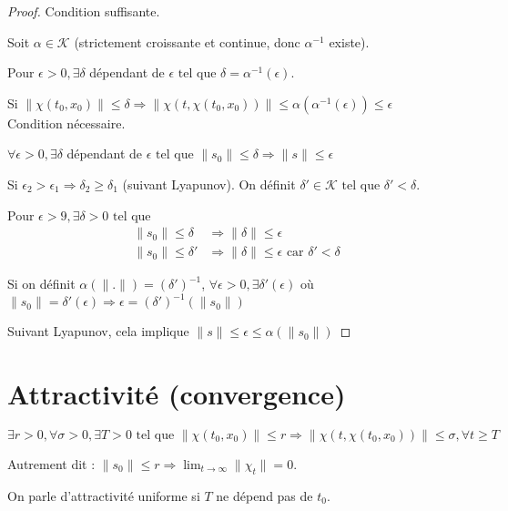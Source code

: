 \documentclass[main.tex]{subfiles} \newcommand{\D}{\mathcal{D}}
\newcommand{\Kc}{\mathcal{K}} \newcommand{\Lc}{\mathcal{L}}
\begin{document}
\begin{proof} Condition suffisante.

  Soit $\alpha \in \Kc$ (strictement croissante et continue, donc $\alpha^{-1}$
	existe).

  Pour $\epsilon >0, \exists \delta$ dépendant de $\epsilon \text{ tel que }
	\delta = \alpha^{-1}(\epsilon)$.

  Si $\|\chi(t_0,x_0)\| \leq \delta \Rightarrow \|\chi(t,\chi(t_0,x_0))\| \leq
	\alpha(\alpha^{-1}(\epsilon)) \leq \epsilon$\\

  Condition nécessaire.

  $\forall \epsilon>0, \exists \delta$ dépendant de $\epsilon \text{ tel que }
	\|s_0\| \leq \delta \Rightarrow \|s\| \leq \epsilon$

  Si $\epsilon_2 > \epsilon_1 \Rightarrow \delta_2 \geq \delta_1$ (suivant
	Lyapunov). On définit $\delta' \in \Kc \text{ tel que } \delta'<\delta$.

  Pour $\epsilon > 9, \exists \delta > 0 \text{ tel que }$ \begin{align*}
  \|s_0\| \leq \delta & \Rightarrow \|\delta\| \leq \epsilon\\ \|s_0\| \leq
  \delta' & \Rightarrow \|\delta\| \leq \epsilon \text{ car } \delta'<\delta
  \end{align*}

  Si on définit $\alpha(\|.\|)=(\delta')^{-1}$, $\forall \epsilon >0, \exists
	\delta'(\epsilon)$ où $\|s_0\|=\delta'(\epsilon) \Rightarrow \epsilon =
	(\delta')^{-1}(\|s_0\|)$

  Suivant Lyapunov, cela implique $\|s\| \leq \epsilon \leq \alpha (\|s_0\|)$
\end{proof}

\section{Attractivité (convergence)} \begin{defin} $\exists r > 0, \forall
	\sigma > 0, \exists T > 0 \text{ tel que } \|\chi(t_0,x_0)\| \leq r
	\Rightarrow \|\chi(t,\chi(t_0,x_0))\| \leq \sigma, \forall t \geq T$


  Autrement dit : $\|s_0\| \leq r \Rightarrow \lim_{t\rightarrow \infty}
	\|\chi_t\| = 0$.

  On parle d'attractivité uniforme si $T$ ne dépend pas de $t_0$.  \end{defin}
\end{document}
